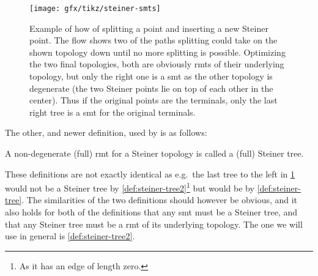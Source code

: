 \begin{figure}[htbp]
  \centering
  \texttt{[image: gfx/tikz/steiner-smts]}
  \caption[Example of splitting and \acsp{rmt}]{Example of how of splitting a point
    and inserting a new Steiner point. The flow shows two of the paths splitting
    could take on the shown topology down until no more splitting is
    possible. Optimizing the two final topologies, both are obviously \acsp{rmt} of
    their underlying topology, but only the right one is a \acs{smt} as the other
    topology is degenerate (the two Steiner points lie on top of each other in the
    center). Thus if the original points are the terminals, only the last right
    tree is a \acs{smt} for the original terminals.\label{fig:steiner-smts}}
\end{figure}

The other, and newer definition, used by \textcite{brazil2015} is as follows:
%
\begin{definition}
  A non-degenerate (full) \ac{rmt} for a Steiner topology is called a (full)
  Steiner tree.\label{def:steiner-tree2}
\end{definition}
%
These definitions are not exactly identical as e.g.\ the last tree to the left
in \cref{fig:steiner-smts} would not be a Steiner tree by
\cref{def:steiner-tree2}\footnote{As it has an edge of length zero.}  but would
be by \cref{def:steiner-tree}. The similarities of the two definitions should
however be obvious, and it also holds for both of the definitions that any
\ac{smt} must be a Steiner tree, and that any Steiner tree must be a \ac{rmt} of
its underlying topology. The one we will use in general is
\cref{def:steiner-tree2}.

